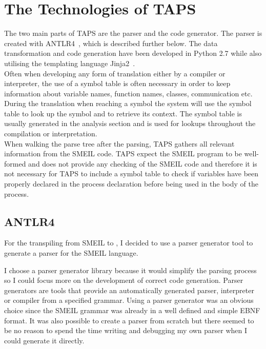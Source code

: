 \section{The Technologies of TAPS}
The two main parts of TAPS are the parser and the code generator. The parser is created with ANTLR4~\cite{antlr}, which is described further below. The data transformation and code generation have been developed in Python 2.7 while also utilising the templating language Jinja2~\cite{jinja2}.\\

Often when developing any form of translation either by a compiler or interpreter, the use of a symbol table is often necessary in order to keep information about variable names, function names, classes, communication etc. During the translation when reaching a symbol the system will use the symbol table to look up the symbol and to retrieve its context. The symbol table is usually generated in the analysis section and is used for lookups throughout the compilation or interpretation. \\

When walking the parse tree after the parsing, TAPS gathers all relevant information from the SMEIL code. TAPS expect the SMEIL program to be well-formed and does not provide any checking of the SMEIL code and therefore it is not necessary for TAPS to include a symbol table to check if variables have been properly declared in the process declaration before being used in the body of the process.
\subsection{ANTLR4}
For the transpiling from SMEIL to \cspm{}, I decided to use a parser generator tool to generate a parser for the SMEIL language.

I choose a parser generator library because it would simplify the parsing process so I could focus more on the development of correct code generation. Parser generators are tools that provide an automatically generated parser, interpreter or compiler from a specified grammar. Using a parser generator was an obvious choice since the SMEIL grammar was already in a well defined and simple EBNF format. It was also possible to create a parser from scratch but there seemed to be no reason to spend the time writing and debugging my own parser when I could generate it directly. \\

